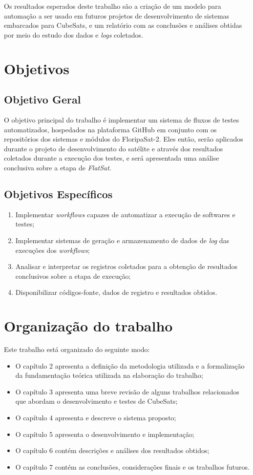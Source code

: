 Os resultados esperados deste trabalho são a criação de um modelo para automação a ser usado em futuros projetos de
desenvolvimento de sistemas embarcados para CubeSats, e um relatório com as conclusões e análises obtidas por meio do
estudo dos dados e \emph{logs} coletados.

\section{Objetivos}

\subsection{Objetivo Geral}

O objetivo principal do trabalho é implementar um sistema de fluxos de testes automatizados, hospedados na plataforma
GitHub em conjunto com os repositórios dos sistemas e módulos do FloripaSat-2. Eles então, serão aplicados durante o
projeto de desenvolvimento do satélite e através dos resultados coletados durante a execução dos testes, e será
apresentada uma análise conclusiva sobre a etapa de \emph{FlatSat}.
\subsection{Objetivos Específicos}

\begin{enumerate}
    \item Implementar \textit{workflows} capazes de automatizar a execução de softwares e testes;
    \item Implementar sistemas de geração e armazenamento de dados de \textit{log} das execuções dos \textit{workflows};
    \item Analisar e interpretar os registros coletados para a obtenção de resultados conclusivos sobre a etapa de execução;
    \item Disponibilizar códigos-fonte, dados de registro e resultados obtidos.
\end{enumerate}
\section{Organização do trabalho}

Este trabalho está organizado do seguinte modo:

\begin{itemize}
    \item O capítulo 2 apresenta a definição da metodologia utilizada e a formalização da fundamentação teórica utilizada
          na elaboração do trabalho;
    \item O capítulo 3 apresenta uma breve revisão de alguns trabalhos relacionados que abordam o desenvolvimento e testes
          de CubeSats;
    \item O capítulo 4 apresenta e descreve o sistema proposto;
    \item O capítulo 5 apresenta o desenvolvimento e implementação;
    \item O capítulo 6 contém descrições e análises dos resultados obtidos;
    \item O capítulo 7 contém as conclusões, considerações finais e os trabalhos futuros.
\end{itemize}
